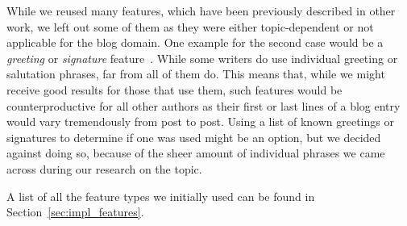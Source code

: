 While we reused many features, which have been previously described in other work, we left out some of them as they were either topic-dependent or not applicable for the blog domain.
One example for the second case would be a \textit{greeting} or \textit{signature} feature~\cite{de2001mining}.
While some writers do use individual greeting or salutation phrases, far from all of them do.
This means that, while we might receive good results for those that use them, such features would be counterproductive for all other authors as their first or last lines of a blog entry would vary tremendously from post to post.
Using a list of known greetings or signatures to determine if one was used might be an option, but we decided against doing so, because of the sheer amount of individual phrases we came across during our research on the topic.

A list of all the feature types we initially used can be found in Section~\ref{sec:impl_features}.
